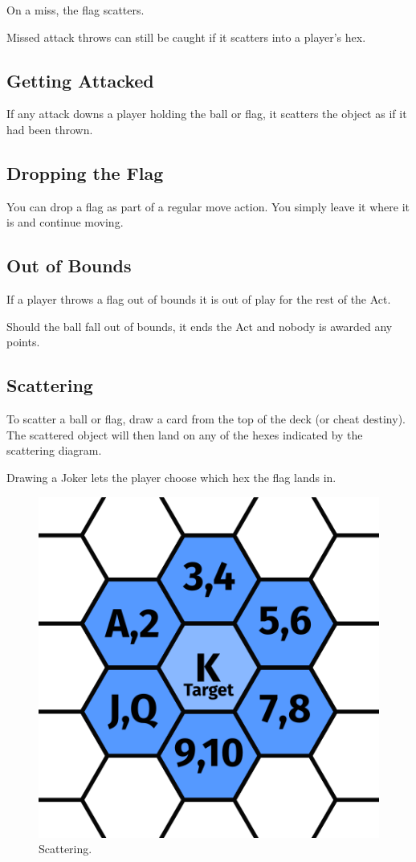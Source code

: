 On a miss, the flag scatters.

\begin{note}
    Missed attack throws can still be caught if it scatters into a player's hex.
\end{note}

\subsection{Getting Attacked}
If any attack downs a player holding the ball or flag, it scatters the object as if it had been thrown.

\subsection{Dropping the Flag}
You can drop a flag as part of a regular move action.
You simply leave it where it is and continue moving.

\subsection{Out of Bounds}
If a player throws a flag out of bounds it is out of play for the rest of the Act.

Should the ball fall out of bounds, it ends the Act and nobody is awarded any points.

\subsection{Scattering}\label{scattering}
To scatter a ball or flag, draw a card from the top of the deck (or cheat destiny).
The scattered object will then land on any of the hexes indicated by the scattering diagram.

\begin{note}
    Drawing a Joker lets the player choose which hex the flag lands in.
\end{note}

\begin{figure}
    \centering
    \includegraphics{graphics/scatter.png}
    \caption{Scattering.}
    \label{fig:scatter-alternative}
\end{figure}